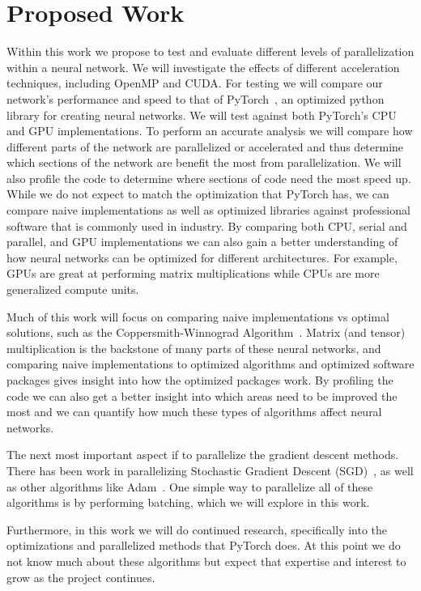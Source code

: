 \documentclass[10pt,twocolumn,letterpaper]{article}
\begin{document}
\section{Proposed Work}
%
Within this work we propose to test and evaluate different levels of
parallelization within a neural network. We will investigate the effects of
different acceleration techniques, including OpenMP and CUDA. For testing we
will compare our network's performance and speed to that of
PyTorch~\cite{paszke2017automatic}, an optimized python library for creating
neural networks. We will test against both PyTorch's CPU and GPU
implementations. To perform an accurate analysis we will compare how different
parts of the network are parallelized or accelerated and thus determine which
sections of the network are benefit the most from parallelization. We will also
profile the code to determine where sections of code need the most speed up.
While we do not expect to match the optimization that PyTorch has, we can
compare naive implementations as well as optimized libraries against
professional software that is commonly used in industry. By comparing both CPU,
serial and parallel, and GPU implementations we can also gain a better
understanding of how neural networks can be optimized for different
architectures. For example, GPUs are great at performing matrix multiplications
while CPUs are more generalized compute units. 

Much of this work will focus on comparing naive implementations vs optimal
solutions, such as the Coppersmith-Winnograd
Algorithm~\cite{COPPERSMITH1990251}. Matrix (and tensor) multiplication is the
backstone of many parts of these neural networks, and comparing naive
implementations to optimized algorithms and optimized software packages gives
insight into how the optimized packages work. By profiling the code we can also
get a better insight into which areas need to be improved the most and we can
quantify how much these types of algorithms affect neural networks. 

The next most important aspect if to parallelize the gradient descent methods.
There has been work in parallelizing Stochastic Gradient Descent
(SGD)~\cite{10.5555/2997046.2997185}, as well as other algorithms like
Adam~\cite{DBLP:journals/corr/KingmaB14}. One simple way to parallelize all of
these algorithms is by performing batching, which we will explore in this work. 

Furthermore, in this work we will do continued research, specifically into the
optimizations and parallelized methods that PyTorch does. At this point we do
not know much about these algorithms but expect that expertise and interest to
grow as the project continues.
\end{document}
